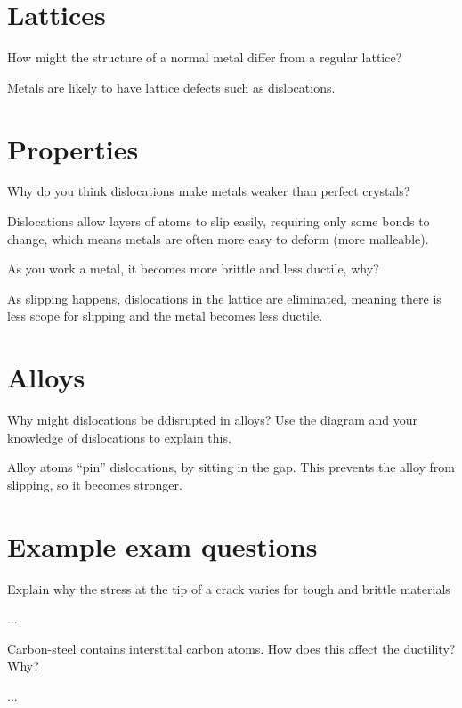 \documentclass{exam}
\begin{document}
\printanswers
\section{Lattices}
\begin{questions}
\question How might the structure of a normal metal differ from a regular lattice?
\begin{solution}[.2in]
    Metals are likely to have lattice defects such as dislocations.
\end{solution}
\end{questions}
\section{Properties}
\begin{questions}
\question Why do you think dislocations make metals weaker than perfect crystals?
\begin{solution}[.2in]
    Dislocations allow layers of atoms to slip easily, requiring only some
    bonds to change, which means metals are often more easy to deform (more
    malleable).
\end{solution}
\question As you work a metal, it becomes more brittle and less ductile, why?
\begin{solution}[.2in]
    As slipping happens, dislocations in the lattice are eliminated, meaning
    there is less scope for slipping and the metal becomes less ductile.
\end{solution}
\end{questions}
\section{Alloys}
\begin{questions}
\question Why might dislocations be ddisrupted in alloys? Use the diagram and
          your knowledge of dislocations to explain this.
\begin{solution}[.2in]
    Alloy atoms ``pin'' dislocations, by sitting in the gap. This prevents the
    alloy from slipping, so it becomes stronger.
\end{solution}
\end{questions}
\section{Example exam questions}
\begin{questions}
\question Explain why the stress at the tip of a crack varies for tough and
          brittle materials
\begin{solution}[.2in]
    ...
\end{solution}
\question Carbon-steel contains interstital carbon atoms. How does this affect
          the ductility? Why?
\begin{solution}[.2in]
    ...
\end{solution}
\end{questions}
\end{document}
